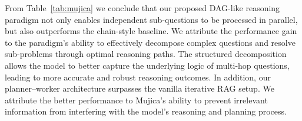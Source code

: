\begin{table}[h]
\centering %
\renewcommand{\arraystretch}{1.1} %

\caption{Experimental results for design choices of the proposed Mujica framework.}
\label{tab:mujica}
\end{table}
From Table~\ref{tab:mujica} we conclude that our proposed DAG-like reasoning paradigm not only enables independent sub-questions to be processed in parallel, but also outperforms the chain-style baseline. We attribute the performance gain to the paradigm’s ability to effectively decompose complex questions and resolve sub-problems through optimal reasoning paths. The structured decomposition allows the model to better capture the underlying logic of multi-hop questions, leading to more accurate and robust reasoning outcomes. In addition, our planner–worker architecture surpasses the vanilla iterative RAG setup. We attribute the better performance to Mujica's ability to prevent irrelevant information from interfering with the model's reasoning and planning process.

